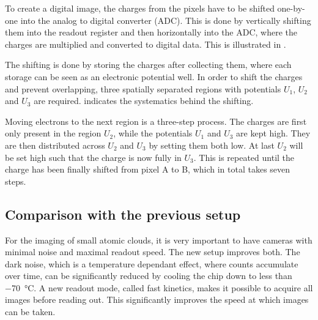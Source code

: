 
To create a digital image, the charges from the pixels have to be shifted one-by-one into the analog to digital converter (ADC). This is done by vertically shifting them into the readout register and then horizontally into the ADC, where the charges are multiplied and converted to digital data. This is illustrated in .

The shifting is done by storing the charges after collecting them, where each storage can be seen as an electronic potential well. In order to shift the charges and prevent overlapping, three spatially separated regions with potentials $U_1$, $U_2$ and $U_3$ are required.  indicates the systematics behind the shifting.


Moving electrons to the next region is a three-step process. The charges are first only present in the region $U_2$, while the potentials $U_1$ and $U_3$ are kept high. They are then distributed across $U_2$ and $U_3$ by setting them both low. At last $U_2$ will be set high such that the charge is now fully in $U_3$. This is repeated until the charge has been finally shifted from pixel A to B, which in total takes seven steps.


\subsection{Comparison with the previous setup}
\label{sec:comparison}
For the imaging of small atomic clouds, it is very important to have cameras with minimal noise and maximal readout speed. The new setup improves both. The dark noise, which is a temperature dependant effect, where counts accumulate over time, can be significantly reduced by cooling the chip down to less than \SI{-70}{\degreeCelsius}. A new readout mode, called fast kinetics, makes it possible to acquire all images before reading out. This significantly improves the speed at which images can be taken.

